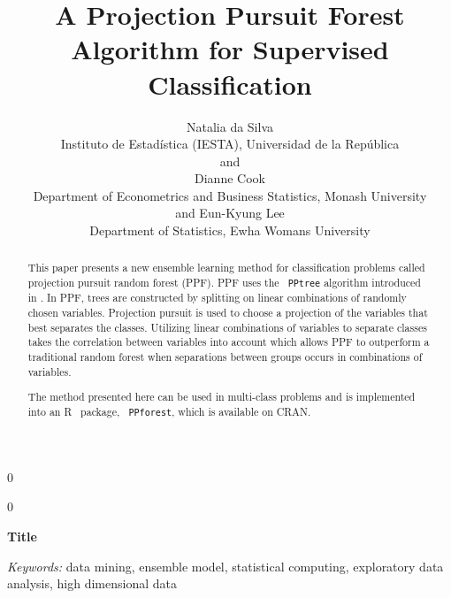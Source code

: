 \documentclass[12pt]{article}\usepackage[]{graphicx}\usepackage[]{color}
\newcommand{\blind}{0}
\begin{document}
\def\spacingset#1{\renewcommand{\baselinestretch}%
{#1}\small\normalsize} \spacingset{1}



\blind
{
  \title{\bf A Projection Pursuit Forest Algorithm for Supervised Classification}
  \author{Natalia da Silva\hspace{.2cm}\\
    Instituto de Estadística (IESTA), Universidad de la República\\
    and \\
    Dianne Cook \\
    Department of Econometrics and Business Statistics, Monash University\\
    and Eun-Kyung Lee\\
    Department of Statistics,  Ewha Womans University }
  \maketitle
} \fi

\blind
{
  \bigskip
  \bigskip
  \bigskip
  \begin{center}
    {\LARGE\bf Title}
\end{center}
  \medskip
} \fi

\bigskip
\begin{abstract}
This paper presents a new ensemble learning method for classification problems called projection pursuit random forest (PPF). PPF uses the \verb# PPtree#  algorithm introduced in \cite{lee2013pptree}. In PPF, trees are constructed by splitting on linear combinations of randomly chosen variables. Projection pursuit is used to choose a projection of the variables that best separates the classes. Utilizing linear combinations of variables to separate classes takes the correlation between variables into account which allows PPF to outperform a traditional random forest when separations between groups occurs in combinations of variables.

The method presented here can be used in multi-class problems and is implemented into an R~\citep{RCore} package, \verb# PPforest#, which is available on CRAN.

\end{abstract}

\noindent%
{\it Keywords:} data mining, ensemble model, statistical computing, exploratory data analysis, high dimensional data
\vfill

\newpage
\spacingset{1.5} %
\end{document}
